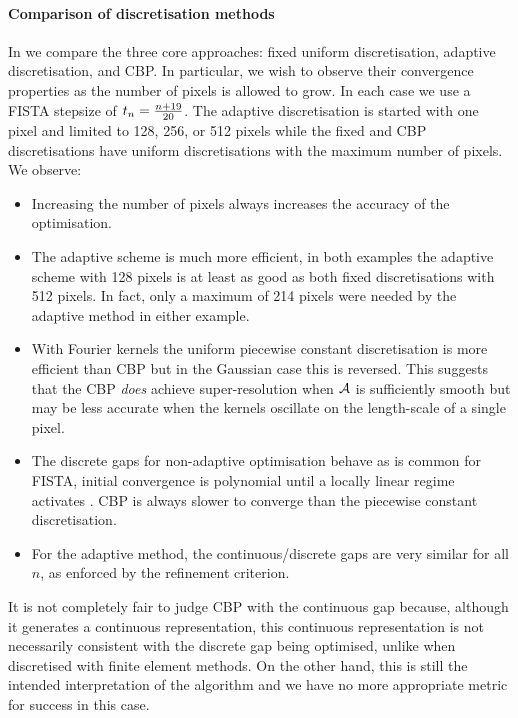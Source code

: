 \documentclass[10pt,a4paper,onecolumn]{article}
\numberwithin{equation}{section}
\newcommand*{\vart}[1]{%
	\IfEqCase{#1}{%
		{0}{s}%
		{1}{t}%
	}[t#1]%
}
\begin{document}
\paragraph{Comparison of discretisation methods}
In  we compare the three core approaches: fixed uniform
discretisation, adaptive discretisation, and CBP. In particular, we wish to observe their convergence properties as the number of pixels is allowed to grow. In each case we use a FISTA stepsize of $\vart1_n = \frac{n+19}{20}$. The adaptive discretisation is started with one pixel and limited to 128, 256, or 512 pixels while the fixed and CBP discretisations have uniform discretisations with the maximum number of pixels. We observe:
\begin{itemize}
	\item Increasing the number of pixels always increases the accuracy of the optimisation.
	\item The adaptive scheme is much more efficient, in both examples the adaptive scheme with 128 pixels is at least as good as both fixed discretisations with 512 pixels. In fact, only a maximum of 214 pixels were needed by the adaptive method in either example.
	\item With Fourier kernels the uniform piecewise constant discretisation is more efficient than CBP but in the Gaussian case this is reversed. This suggests that the CBP \emph{does} achieve super-resolution when $\mathcal{A}$ is sufficiently smooth but may be less accurate when the kernels oscillate on the length-scale of a single pixel.
	\item The discrete gaps for non-adaptive optimisation behave as is common for FISTA, initial convergence is polynomial until a locally linear regime activates \citep{Tao2016}. CBP is always slower to converge than the piecewise constant discretisation.
	\item For the adaptive method, the continuous/discrete gaps are very similar for all $n$, as enforced by the refinement criterion.
\end{itemize}
It is not completely fair to judge CBP with the continuous gap because, although it generates a continuous representation, this continuous representation is not necessarily consistent with the discrete gap being optimised, unlike when discretised with finite element methods. On the other hand, this is still the intended interpretation of the algorithm and we have no more appropriate metric for success in this case.
\end{document}
